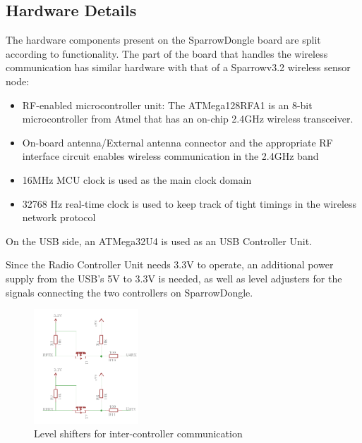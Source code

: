 \label{chap:impl}

 \subsection{Hardware Details}

The hardware components present on the SparrowDongle board are split according
to functionality. The part of the board that handles the wireless communication
has similar hardware with that of a Sparrowv3.2 wireless sensor node:

\begin{itemize}

\item RF-enabled microcontroller unit: The ATMega128RFA1 is an 8-bit
microcontroller from Atmel that has an on-chip 2.4GHz wireless transceiver.

\item On-board antenna/External antenna connector and the appropriate RF
interface circuit enables wireless communication in the 2.4GHz band

\item 16MHz MCU clock is used as the main clock domain

\item 32768 Hz real-time clock is used to keep track of tight timings in the
wireless network protocol

\end{itemize}

On the USB side, an ATMega32U4 is used as an USB Controller Unit.

Since the Radio Controller Unit needs 3.3V to operate, an additional power
supply from the USB's 5V to 3.3V is needed, as well as level adjusters for the
signals connecting the two controllers on SparrowDongle.



\begin{figure}[ht] \centering
\includegraphics[width=0.35\textwidth]{img/nivel.png} \caption{Level shifters
for inter-controller communication} \end{figure}



